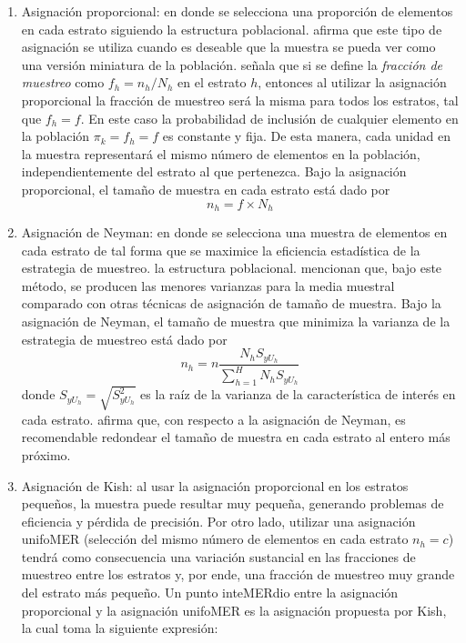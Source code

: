 \documentclass[
  12pt,
  spanish,
]{book}
\begin{document}
\begin{enumerate}
\def\labelenumi{\arabic{enumi}.}
\item
  Asignación proporcional: en donde se selecciona una proporción de elementos en cada estrato siguiendo la estructura poblacional. \citet{Lohr_2019} afirma que este tipo de asignación se utiliza cuando es deseable que la muestra se pueda ver como una versión miniatura de la población. \citet{Gutierrez_2016} señala que si se define la \emph{fracción de muestreo} como \(f_h=n_h/N_h\) en el estrato \(h\), entonces al utilizar la asignación proporcional la fracción de muestreo será la misma para todos los estratos, tal que \(f_h=f\). En este caso la probabilidad de inclusión de cualquier elemento en la población \(\pi_k=f_h=f\) es constante y fija. De esta manera, cada unidad en la muestra representará el mismo número de elementos en la población, independientemente del estrato al que pertenezca. Bajo la asignación proporcional, el tamaño de muestra en cada estrato está dado por
  \[
  n_h=f \times N_h
  \]
\item
  Asignación de Neyman: en donde se selecciona una muestra de elementos en cada estrato de tal forma que se maximice la eficiencia estadística de la estrategia de muestreo. la estructura poblacional. \citet{Groves_Fowler_Couper_Lepkowski_Singer_Tourangeau_2009} mencionan que, bajo este método, se producen las menores varianzas para la media muestral comparado con otras técnicas de asignación de tamaño de muestra. Bajo la asignación de Neyman, el tamaño de muestra que minimiza la varianza de la estrategia de muestreo está dado por
  \[
  n_h=n\dfrac{N_hS_{yU_h}}{\sum_{h=1}^HN_hS_{yU_h}}
  \]
  donde \(S_{yU_h}=\sqrt{S_{yU_h}^2}\) es la raíz de la varianza de la característica de interés en cada estrato. \citet{Gutierrez_2016} afirma que, con respecto a la asignación de Neyman, es recomendable redondear el tamaño de muestra en cada estrato al entero más próximo.
\item
  Asignación de Kish: al usar la asignación proporcional en los estratos pequeños, la muestra puede resultar muy pequeña, generando problemas de eficiencia y pérdida de precisión. Por otro lado, utilizar una asignación unifoMER (selección del mismo número de elementos en cada estrato \(n_h = c\)) tendrá como consecuencia una variación sustancial en las fracciones de muestreo entre los estratos y, por ende, una fracción de muestreo muy grande del estrato más pequeño. Un punto inteMERdio entre la asignación proporcional y la asignación unifoMER es la asignación propuesta por Kish, la cual toma la siguiente expresión:
\end{enumerate}
\end{document}
